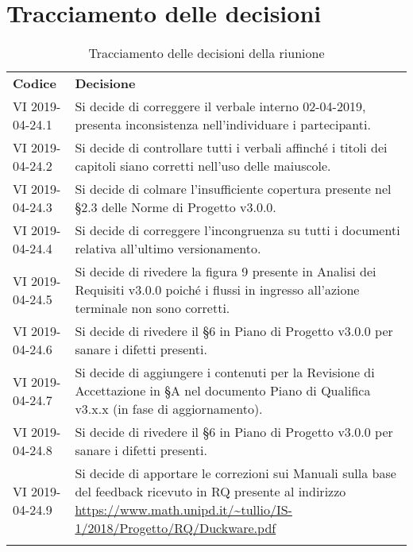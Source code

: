 \clearpage
\section{Tracciamento delle decisioni}
\begin{center}
	\renewcommand{\arraystretch}{1.5}
	\begin{longtable}{  p{2.8cm} p{11.4cm} }
		\rowcolor{tableHeadYellow}
		\textbf{Codice}&\textbf{Decisione}\\
		VI 2019-04-24.1 & Si decide di correggere il verbale interno 02-04-2019, presenta inconsistenza nell'individuare i partecipanti.\\
		VI 2019-04-24.2 & Si decide di controllare tutti i verbali affinché i titoli dei capitoli siano corretti nell'uso delle maiuscole.\\
		VI 2019-04-24.3 & Si decide di colmare l'insufficiente copertura presente nel §2.3 delle Norme di Progetto v3.0.0.\\
		VI 2019-04-24.4 & Si decide di correggere l'incongruenza su tutti i documenti relativa all'ultimo versionamento.\\
		VI 2019-04-24.5 & Si decide di rivedere la figura 9 presente in Analisi dei Requisiti v3.0.0 poiché i flussi in ingresso all’azione
		terminale non sono corretti.\\
		VI 2019-04-24.6 & Si decide di rivedere il §6 in Piano di Progetto v3.0.0 per sanare i difetti presenti.\\
		VI 2019-04-24.7 & Si decide di aggiungere i contenuti per la Revisione di Accettazione in §A nel documento Piano di Qualifica v3.x.x (in fase di aggiornamento).\\
		VI 2019-04-24.8 & Si decide di rivedere il §6 in Piano di Progetto v3.0.0 per sanare i difetti presenti.\\
		VI 2019-04-24.9 & Si decide di apportare le correzioni sui Manuali sulla base del feedback ricevuto in RQ presente al indirizzo \url{https://www.math.unipd.it/~tullio/IS-1/2018/Progetto/RQ/Duckware.pdf} \\
		\rowcolor{white}
		\caption{Tracciamento delle decisioni della riunione}
	\end{longtable}	
\end{center}